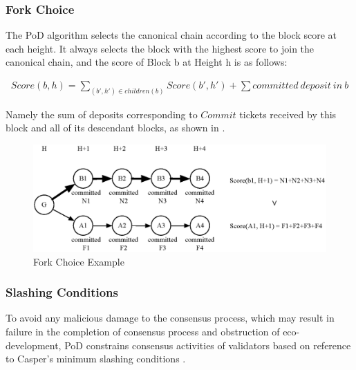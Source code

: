 \subsubsection{Fork Choice}
\label{pod:design:fork}

The PoD algorithm selects the canonical chain according to the block score at each height. It always selects the block with the highest score to join the canonical chain, and the score of Block b at Height h is as follows:


\begin{align}
Score(b, h) = \sum_{(b',h') \in children(b)}Score(b', h') + \sum committed~deposit~in~b
\end{align}
\noindent 

Namely the sum of deposits corresponding to $Commit$ tickets received by this block and all of its descendant blocks, as shown in .


\begin{figure}[h]
\centering
\includegraphics[width=12cm]{./figs/fork}
\caption{Fork Choice Example}
\label{fig:fork_choice}
\end{figure}

\subsubsection{Slashing Conditions}
\label{pod:design:vote}

To avoid any malicious damage to the consensus process, which may result in failure in the completion of consensus process and obstruction of eco-development, PoD constrains consensus activities of validators based on reference to Casper’s minimum slashing conditions \cite{minimal_slash_rules}.



